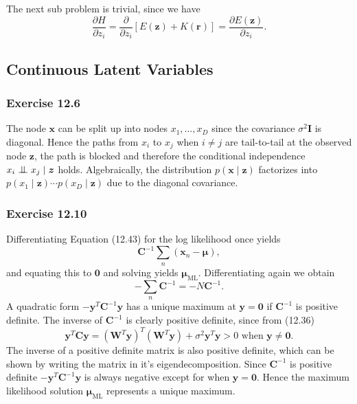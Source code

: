 \documentclass[12pt, a4paper]{article}
\newcommand{\vect}[1]{\bm{#1}}
\newcommand{\bigCI}{\mathrel{\text{\scalebox{1.07}{$\perp\mkern-10mu\perp$}}}}
\begin{document}
The next sub problem is trivial, since we have
\begin{equation*}
	\frac{\partial H}{\partial z_i}
	= \frac{\partial}{\partial z_i} \left[ E(\vect{z}) + K(\vect{r}) \right]
	=  \frac{\partial E(\vect{z})}{\partial z_i}.
\end{equation*}

\subsection{Continuous Latent Variables}
\subsubsection*{Exercise 12.6}
The node $\vect{x}$ can be split up into nodes $x_1, \ldots, x_D$ since the covariance $\sigma^2 \vect{I}$ is diagonal.
Hence the paths from $x_i$ to $x_j$ when $i \neq j$ are tail-to-tail at the observed node $\vect{z}$, the path is blocked and therefore the conditional independence $x_i \bigCI x_j \mid \vect{z}$ holds.
Algebraically, the distribution $p(\vect{x} \mid \vect{z})$ factorizes into $p(x_1 \mid \vect{z}) \cdots p(x_D \mid \vect{z})$ due to the diagonal covariance.

\subsubsection*{Exercise 12.10}
Differentiating Equation (12.43) for the log likelihood once yields
\begin{equation*}
	\vect{C}^{-1} \sum_n (\vect{x}_n - \vect{\mu}),
\end{equation*}
and equating this to $\vect{0}$ and solving yields $\vect{\mu}_\text{ML}$.
Differentiating again we obtain
\begin{equation*}
 -\sum_n\vect{C}^{-1} = -N \vect{C}^{-1}.
\end{equation*}
A quadratic form $-\vect{y}^T \vect{C}^{-1} \vect{y}$ has a unique maximum at $\vect{y} = \vect{0}$ if $\vect{C}^{-1}$ is positive definite.
The inverse of $\vect{C}^{-1}$ is clearly positive definite, since from (12.36)
\begin{equation*}
	\vect{y}^T \vect{C} \vect{y} = 
	\left( \vect{W}^T \vect{y} \right)^T \left( \vect{W}^T \vect{y} \right)
	+
	\sigma^2 \vect{y}^T\vect{y} >0 \text{ when } \vect{y} \neq \vect{0}.
\end{equation*}
The inverse of a positive definite matrix is also positive definite, which can be shown by writing the matrix in it's eigendecomposition.
Since $\vect{C}^{-1}$ is positive definite $-\vect{y}^T \vect{C}^{-1} \vect{y}$ is always negative except for when $\vect{y} = \vect{0}$. 
Hence the maximum likelihood solution $\vect{\mu}_\text{ML}$ represents a unique maximum.
\end{document}
